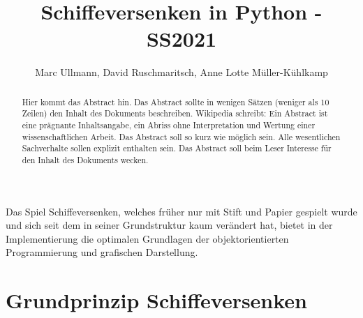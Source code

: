 \documentclass{llncs}
\begin{document}
%
%
%
\mainmatter              %
%
\title{Schiffeversenken in Python - SS2021}
%
\author{Marc Ullmann, David Ruschmaritsch, Anne Lotte Müller-Kühlkamp}
%

\maketitle              %

\begin{abstract}
Hier kommt das Abstract hin. Das Abstract sollte in wenigen Sätzen (weniger als 10 Zeilen) den Inhalt des Dokuments beschreiben. Wikipedia schreibt: Ein Abstract ist eine prägnante Inhaltsangabe, ein Abriss ohne Interpretation und Wertung einer wissenschaftlichen Arbeit. Das Abstract soll so kurz wie möglich sein. Alle wesentlichen Sachverhalte sollen explizit enthalten sein. Das Abstract soll beim Leser Interesse für den Inhalt des Dokuments wecken.
\end{abstract}

Das Spiel Schiffeversenken, welches früher nur mit Stift und Papier gespielt wurde und sich seit dem in seiner Grundstruktur kaum verändert hat, bietet in der Implementierung die optimalen Grundlagen der objektorientierten Programmierung und
grafischen Darstellung.

\section{Grundprinzip Schiffeversenken}
\end{document}
